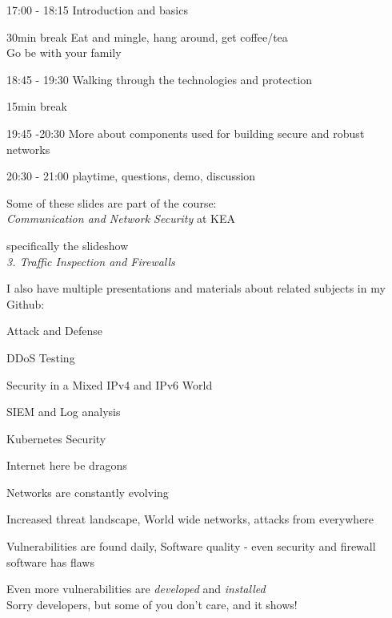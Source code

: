 \documentclass[Screen16to9,17pt]{foils}
\begin{document}
\begin{list2}
\item 17:00 - 18:15  Introduction and basics\\

\item 30min break  Eat and mingle, hang around, get coffee/tea\\
Go be with your family

\item 18:45 - 19:30 Walking through the technologies and protection\\

\item 15min break\\

\item 19:45 -20:30 More about components used for building secure and robust networks\\

\item 20:30 - 21:00 playtime, questions, demo, discussion
\end{list2}



Some of these slides are part of the course:\\
\emph{Communication and Network Security} at KEA

specifically the slideshow\\
\emph{3. Traffic Inspection and Firewalls}

I also have multiple presentations and materials about related subjects in my Github:

\begin{list2}
\item Attack and Defense
\item DDoS Testing
\item Security in a Mixed IPv4 and IPv6 World
\item SIEM and Log analysis
\item Kubernetes Security
\end{list2}


\centerline{\Large Internet here be dragons}

\begin{list2}
\item Networks are constantly evolving
\item Increased threat landscape, World wide networks, attacks from everywhere
\item Vulnerabilities are found daily, Software quality - even security and firewall software has flaws
\item Even more vulnerabilities are \emph{developed} and \emph{installed}\\
Sorry developers, but some of you don't care, and it shows!
\end{list2}
\end{document}

